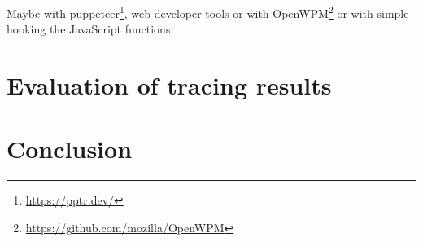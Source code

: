 \documentclass[article,type=bsc,colorback,accentcolor=tud9c]{tudthesis}
\begin{document}
  Maybe with puppeteer\footnote{\url{https://pptr.dev/}}, web developer tools or with OpenWPM\footnote{\url{https://github.com/mozilla/OpenWPM}} or with simple hooking the JavaScript functions



  
  \newpage
  \section{Evaluation of tracing results}

  
  \newpage
  \section{Conclusion}

  

  

   
\end{document}
